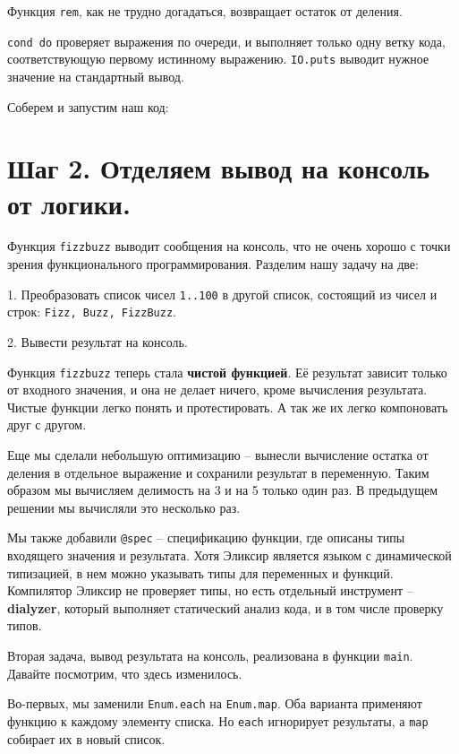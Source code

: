 Функция \texttt{rem}, как не трудно догадаться, возвращает остаток от деления.

\texttt{cond do} проверяет выражения по очереди, и выполняет только одну ветку кода, соответствующую первому истинному выражению. \texttt{IO.puts} выводит нужное значение на стандартный вывод.

Соберем и запустим наш код:


\section{Шаг 2. Отделяем вывод на консоль от логики.}

Функция \texttt{fizzbuzz} выводит сообщения на консоль, что не очень хорошо с точки зрения функционального программирования. Разделим нашу задачу на две:

1. Преобразовать список чисел \texttt{1..100} в другой список, состоящий из чисел и строк: \texttt{Fizz, Buzz, FizzBuzz}.

2. Вывести результат на консоль.



Функция \texttt{fizzbuzz} теперь стала \textbf{чистой функцией}. Её результат зависит только от входного значения, и она не делает ничего, кроме вычисления результата. Чистые функции легко понять и протестировать. А так же их легко компоновать друг с другом.

Еще мы сделали небольшую оптимизацию -- вынесли вычисление остатка от деления в отдельное выражение и сохранили результат в переменную. Таким образом мы вычисляем делимость на 3 и на 5 только один раз. В предыдущем решении мы вычисляли это несколько раз.

Мы также добавили \texttt{@spec} -- спецификацию функции, где описаны типы входящего значения и результата. Хотя Эликсир является языком с динамической типизацией, в нем можно указывать типы для переменных и функций. Компилятор Эликсир не проверяет типы, но есть отдельный инструмент -- \textbf{dialyzer}, который выполняет статический анализ кода, и в том числе проверку типов.

Вторая задача, вывод результата на консоль, реализована в функции \texttt{main}. Давайте посмотрим, что здесь изменилось.

Во-первых, мы заменили \texttt{Enum.each} на \texttt{Enum.map}. Оба варианта применяют функцию к каждому элементу списка. Но \texttt{each} игнорирует результаты, а \texttt{map} собирает их в новый список.

